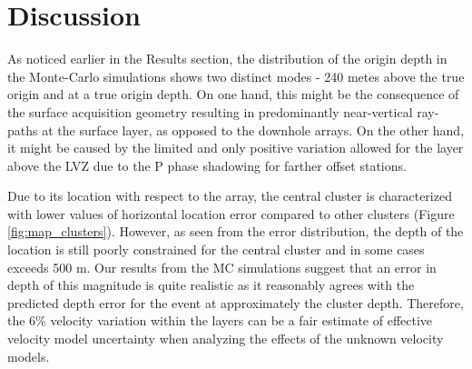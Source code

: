 \documentclass[letterpaper,11pt]{article}
\begin{document}
\section*{Discussion}
As noticed earlier in the Results section, the distribution of the origin depth in the Monte-Carlo simulations shows two distinct modes - 240 metes above the true origin and at a true origin depth. On one hand, this might be the consequence of the surface acquisition geometry resulting in predominantly near-vertical ray-paths at the surface layer, as opposed to the downhole arrays. On the other hand, it might be caused by the limited and only positive variation allowed for the layer above the LVZ due to the P phase shadowing for farther offset stations.

Due to its location with respect to the array, the central cluster is characterized with lower values of horizontal location error compared to other clusters (Figure \ref{fig:map_clusters}). However, as seen from the error distribution, the depth of the location is still poorly constrained for the central cluster and in some cases exceeds 500 m. Our results from the MC simulations suggest that an error in depth of this magnitude is quite realistic as it reasonably agrees with the predicted depth error for the event at approximately the cluster depth. Therefore, the 6\% velocity variation within the layers can be a fair estimate of effective velocity model uncertainty when analyzing the effects of the unknown velocity models.


\end{document}
